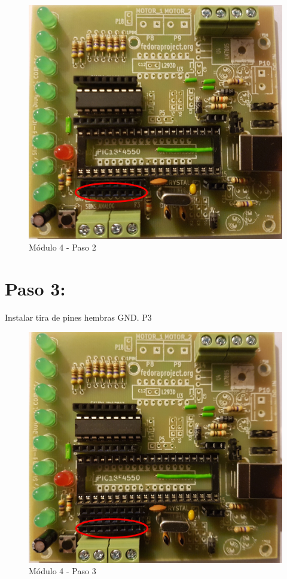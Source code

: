 \begin{figure}[h]
	\centering
	\includegraphics[width=0.8\linewidth]{Modulo_4/M4_2}
	\caption{Módulo 4 - Paso 2}
	\label{fig:M4_2}
\end{figure}

\newpage

\section{Paso 3:}

Instalar tira de pines hembras GND. P3

\begin{figure}[h]
	\centering
	\includegraphics[width=0.8\linewidth]{Modulo_4/M4_3}
	\caption{Módulo 4 - Paso 3}
	\label{fig:M4_3}
\end{figure}

